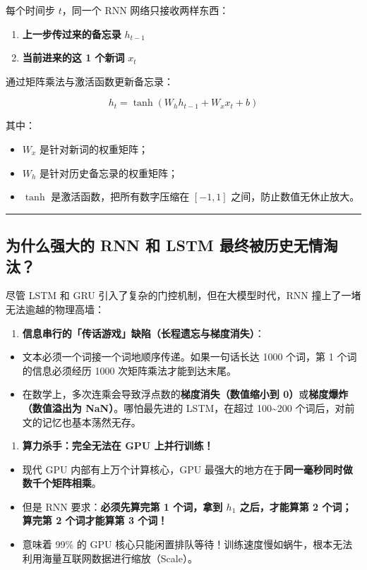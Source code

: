 每个时间步 $t$，同一个 RNN 网络只接收两样东西：
\begin{enumerate}
  \item \textbf{上一步传过来的备忘录} $h_{t-1}$
  \item \textbf{当前进来的这 1 个新词} $x_t$
\end{enumerate}

通过矩阵乘法与激活函数更新备忘录：

\[
h_t = \tanh(W_h h_{t-1} + W_x x_t + b)
\]

其中：
\begin{itemize}
  \item $W_x$ 是针对新词的权重矩阵；
  \item $W_h$ 是针对历史备忘录的权重矩阵；
  \item $\tanh$ 是激活函数，把所有数字压缩在 $[-1, 1]$ 之间，防止数值无休止放大。
\end{itemize}

\vspace{0.8em}\hrule\vspace{0.8em}

\subsection{为什么强大的 RNN 和 LSTM 最终被历史无情淘汰？}

尽管 LSTM 和 GRU 引入了复杂的门控机制，但在大模型时代，RNN 撞上了一堵无法逾越的物理高墙：

\begin{enumerate}
  \item \textbf{信息串行的「传话游戏」缺陷（长程遗忘与梯度消失）}：
\end{enumerate}

\begin{itemize}
  \item 文本必须一个词接一个词地顺序传递。如果一句话长达 1000 个词，第 1 个词的信息必须经历 1000 次矩阵乘法才能到达末尾。
  \item 在数学上，多次连乘会导致浮点数的\textbf{梯度消失（数值缩小到 0）}或\textbf{梯度爆炸（数值溢出为 NaN）}。哪怕最先进的 LSTM，在超过 100\textasciitilde{}200 个词后，对前文的记忆也基本荡然无存。
\end{itemize}

\begin{enumerate}
  \item \textbf{算力杀手：完全无法在 GPU 上并行训练！}
\end{enumerate}

\begin{itemize}
  \item 现代 GPU 内部有上万个计算核心，GPU 最强大的地方在于\textbf{同一毫秒同时做数千个矩阵相乘}。
  \item 但是 RNN 要求：\textbf{必须先算完第 1 个词，拿到 $h_1$ 之后，才能算第 2 个词；算完第 2 个词才能算第 3 个词！}
  \item 意味着 99\% 的 GPU 核心只能闲置排队等待！训练速度慢如蜗牛，根本无法利用海量互联网数据进行缩放（Scale）。
\end{itemize}

